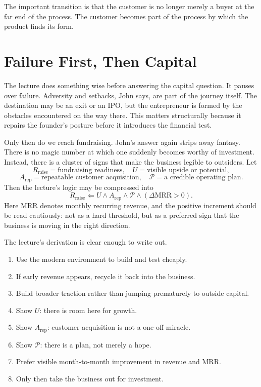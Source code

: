The important transition is that the customer is no longer merely a buyer at the far end of the process. The customer becomes part of the process by which the product finds its form.

\section{Failure First, Then Capital}

The lecture does something wise before answering the capital question. It pauses over failure. Adversity and setbacks, John says, are part of the journey itself. The destination may be an exit or an IPO, but the entrepreneur is formed by the obstacles encountered on the way there. This matters structurally because it repairs the founder's posture before it introduces the financial test.

Only then do we reach fundraising. John's answer again strips away fantasy. There is no magic number at which one suddenly becomes worthy of investment. Instead, there is a cluster of signs that make the business legible to outsiders. Let
\[
R_{\mathrm{raise}} = \text{fundraising readiness},\quad
U = \text{visible upside or potential},
\]
\[
A_{\mathrm{rep}} = \text{repeatable customer acquisition},\quad
\mathcal{P} = \text{a credible operating plan}.
\]
Then the lecture's logic may be compressed into
\begin{equation}
R_{\mathrm{raise}} \Leftarrow U \land A_{\mathrm{rep}} \land \mathcal{P} \land (\Delta \mathrm{MRR} > 0).
\end{equation}
Here \(\mathrm{MRR}\) denotes monthly recurring revenue, and the positive increment should be read cautiously: not as a hard threshold, but as a preferred sign that the business is moving in the right direction.

The lecture's derivation is clear enough to write out.
\begin{enumerate}
\item Use the modern environment to build and test cheaply.
\item If early revenue appears, recycle it back into the business.
\item Build broader traction rather than jumping prematurely to outside capital.
\item Show \(U\): there is room here for growth.
\item Show \(A_{\mathrm{rep}}\): customer acquisition is not a one-off miracle.
\item Show \(\mathcal{P}\): there is a plan, not merely a hope.
\item Prefer visible month-to-month improvement in revenue and \(\mathrm{MRR}\).
\item Only then take the business out for investment.
\end{enumerate}


